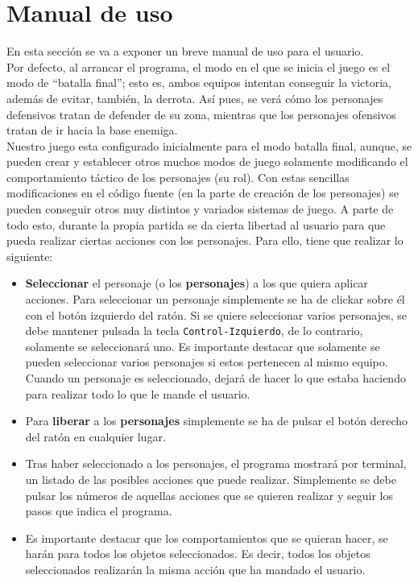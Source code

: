 \medskip
\section{Manual de uso}
En esta sección se va a exponer un breve manual de uso para el usuario. \\

Por defecto, al arrancar el programa, el modo en el que se inicia el juego es el modo de ``batalla final''; esto es, ambos equipos intentan conseguir la victoria, además de evitar, también, la derrota. Así pues, se verá cómo los personajes defensivos tratan de defender de su zona, mientras que los personajes ofensivos tratan de ir hacia la base enemiga. \\

Nuestro juego esta configurado inicialmente para el modo batalla final, aunque, se pueden crear y establecer otros muchos modos de juego solamente modificando el comportamiento táctico de los personajes (su rol). Con estas sencillas modificaciones en el código fuente (en la parte de creación de los personajes) se pueden conseguir otros muy distintos y variados sistemas de juego. A parte de todo esto, durante la propia partida se da cierta libertad al usuario para que pueda realizar ciertas acciones con los personajes. Para ello, tiene que realizar lo siguiente:

\begin{itemize}
 \item \textbf{Seleccionar} el personaje (o los \textbf{personajes}) a los que quiera aplicar acciones. Para seleccionar un personaje simplemente se ha de clickar sobre él con el botón izquierdo del ratón. Si se quiere seleccionar varios personajes, se debe mantener pulsada la tecla \texttt{Control-Izquierdo}, de lo contrario, solamente se seleccionará uno. Es importante destacar que solamente se pueden seleccionar varios personajes si estos pertenecen al mismo equipo. Cuando un personaje es seleccionado, dejará de hacer lo que estaba haciendo para realizar todo lo que le mande el usuario.
 
 \item Para \textbf{liberar} a los \textbf{personajes} simplemente se ha de pulsar el botón derecho del ratón en cualquier lugar.
 
 \item Tras haber seleccionado a los personajes, el programa mostrará por terminal, un listado de las posibles acciones que puede realizar. Simplemente se debe pulsar los números de aquellas acciones que se quieren realizar y seguir los pasos que indica el programa.
 \item Es importante destacar que los comportamientos que se quieran hacer, se harán para todos los objetos seleccionados. Es decir, todos los objetos seleccionados realizarán la misma acción que ha mandado el usuario.
\end{itemize}

